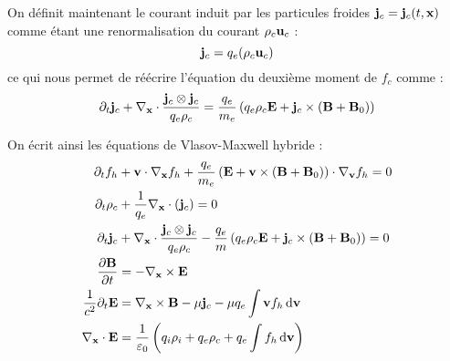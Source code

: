 On définit maintenant le courant induit par les particules froides $\vb{j}_c=\vb{j}_c(t,\vb{x})$ comme étant une renormalisation du courant $\rho_c\vb{u}_c$ :
$$
  \vb{j}_c = q_e(\rho_c\vb{u}_c)
$$
ce qui nous permet de réécrire l'équation du deuxième moment de $f_c$ comme :
$$
  \partial_t\vb{j}_c + \nabla_{\vb{x}}\cdot\frac{\vb{j}_c\otimes\vb{j}_c}{q_e\rho_c} = \frac{q_e}{m_e}\left( q_e\rho_c\vb{E} + \vb{j}_c\times(\vb{B}+\vb{B}_0) \right)
$$

On écrit ainsi les équations de Vlasov-Maxwell hybride :
\begin{align}
	\label{eq:0:vmh:1}
		\partial_t f_h &+ \vb{v}\cdot\nabla_{\vb{x}} f_h + \frac{q_e}{m_e}\left( \vb{E} + \vb{v}\times(\vb{B}+\vb{B}_0) \right)\cdot\nabla_{\vb{v}} f_h = 0 \\
	\label{eq:0:vmh:2}
		\partial_t\rho_c &+ \frac{1}{q_e}\nabla_{\vb{x}}\cdot(\vb{j}_c) = 0 \\
	\label{eq:0:vmh:3}
		\partial_t\vb{j}_c &+ \nabla_{\vb{x}}\cdot\frac{\vb{j}_c\otimes\vb{j}_c}{q_e\rho_c} - \frac{q_e}{m}\left( q_e\rho_c\vb{E} + \vb{j}_c\times(\vb{B}+\vb{B}_0) \right) = 0 \\
	\label{eq:0:vmh:4}
		\pdv{\vb{B}}{t} &= - \nabla_{\vb{x}}\times\vb{E} \\
	\label{eq:0:vmh:5}
		\frac{1}{c^2}\partial_t\vb{E} &= \nabla_{\vb{x}}\times \vb{B} - \mu\vb{j}_c - \mu q_e\int \vb{v} f_h\dd{\vb{v}} \\
	\label{eq:0:vmh:6}
		\nabla_{\vb{x}}\cdot\vb{E} &= \frac{1}{\varepsilon_0}\left( q_i\rho_i + q_e\rho_c + q_e\int f_h\dd{\vb{v}} \right)
\end{align}

